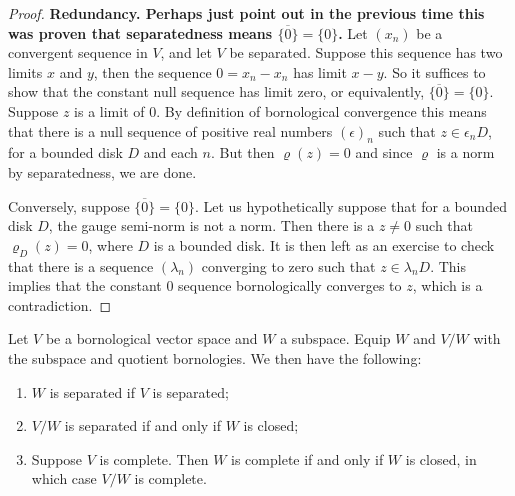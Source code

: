 \begin{proof}
    \textbf{Redundancy. Perhaps just point out in the previous time this was proven that separatedness means \(\overline{\{0\}} = \{0\}\).} Let \((x_n)\) be a convergent sequence in \(V\), and let \(V\) be separated. Suppose this sequence has two limits \(x\) and \(y\), then the sequence \(0 = x_n - x_n\) has limit \(x - y\). So it suffices to show that the constant null sequence has limit zero, or equivalently, \(\overline{\{0\}} = \{0\}\). Suppose \(z\) is a limit of \(0\). By definition of bornological convergence this means that there is a null sequence of positive real numbers \((\epsilon)_n\) such that \(z \in \epsilon_n D\), for a bounded disk \(D\) and each \(n\). But then \(\varrho(z) = 0\) and since \(\varrho\) is a norm by separatedness, we are done.

    Conversely, suppose \(\overline{\{0\}} = \{0\}\). Let us hypothetically suppose that for a bounded disk \(D\), the gauge semi-norm is not a norm. Then there is a \(z \neq 0\) such that \(\varrho_D(z) = 0\), where \(D\) is a bounded disk. It is then left as an exercise to check that there is a sequence \((\lambda_n)\) converging to zero such that \(z \in \lambda_n D\). This implies that the constant \(0\) sequence bornologically converges to \(z\), which is a contradiction. 
\end{proof}

\begin{lemma}\label{lem:extensions-inherentance}
Let \(V\) be a bornological vector space and \(W\) a subspace. Equip \(W\) and \(V/W\) with the subspace and quotient bornologies. We then have the following:
\begin{enumerate}
    \item\label{eq:1} \(W\) is separated if \(V\) is separated;
    \item\label{eq:2} \(V/W\) is separated if and only if \(W\) is closed;
    \item\label{eq:3} Suppose \(V\) is complete. Then \(W\) is complete if and only if \(W\) is closed, in which case \(V/W\) is complete.
\end{enumerate}
\end{lemma}

